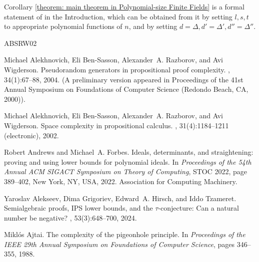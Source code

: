 \documentclass[11pt,letter]{article}
\theoremstyle{remark} %
\let\etalchar\relax %
\begin{document}
{Corollary \ref{theorem: main theorem in Polynomial-size Finite Fields} is a formal statement of  in the Introduction, which can be obtained from it by setting $l, s, t$ to appropriate polynomial functions of $n$, and by setting $d = \Delta, d' = \Delta', d'' = \Delta''$.

\let\etalchar\relax %

\small
    


\let\etalchar\relax %






\newcommand{\etalchar}[1]{$^{#1}$}
\begin{thebibliography}{ABSRW02}

Michael Alekhnovich, Eli Ben{-}Sasson, Alexander~A. Razborov, and Avi Wigderson.
\newblock Pseudorandom generators in propositional proof complexity.
, 34(1):67--88, 2004.
\newblock (A preliminary version appeared in Proceedings of the 41st Annual Symposium on Foundations of Computer Science (Redondo Beach, CA, 2000)).

Michael Alekhnovich, Eli Ben-Sasson, Alexander~A. Razborov, and Avi Wigderson.
\newblock Space complexity in propositional calculus.
, 31(4):1184--1211 (electronic), 2002.

Robert Andrews and Michael~A. Forbes.
\newblock Ideals, determinants, and straightening: proving and using lower bounds for polynomial ideals.
\newblock In {\em Proceedings of the 54th Annual ACM SIGACT Symposium on Theory of Computing}, STOC 2022, page 389–402, New York, NY, USA, 2022. Association for Computing Machinery.

Yaroslav Alekseev, Dima Grigoriev, Edward~A. Hirsch, and Iddo Tzameret.
\newblock Semialgebraic proofs, {IPS} lower bounds, and the {\(\tau\)}-conjecture: Can a natural number be negative?
, 53(3):648--700, 2024.

Mikl\'{o}s Ajtai.
\newblock The complexity of the pigeonhole principle.
\newblock In {\em Proceedings of the IEEE 29th Annual Symposium on Foundations of Computer Science}, pages 346--355, 1988.


\end{thebibliography}}
\end{document}
